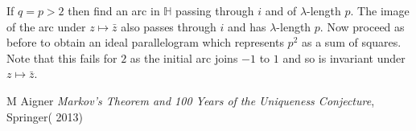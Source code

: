 \documentclass[14pt,a4paper]{amsart}
\def\HH{\mathbb{H}}
\begin{document}
If $q=p>2$ then find an arc in $\HH$ passing through $i$ and of
$\lambda$-length $p$. The image of the arc under $z \mapsto \bar{z}$
also passes through $i$ and has $\lambda$-length $p$. Now proceed as
before to obtain an ideal parallelogram
which represents $p^2$ as a sum of squares.
Note that this fails for $2$ as the initial arc joins $-1$ to $1$
and so is invariant under $z \mapsto \bar{z}$.



%
%
%
% 
%



%

%
%




M Aigner
\textit{Markov's Theorem and 100 Years of the Uniqueness Conjecture}, Springer( 2013)
\end{document}
